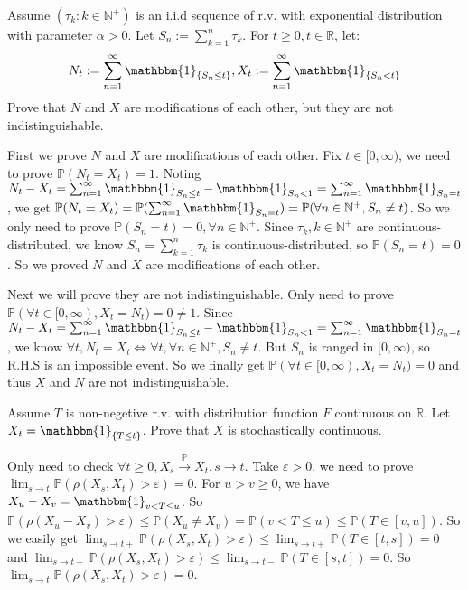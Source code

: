 \documentclass[../main]{subfiles}
\begin{document}
\begin{problem}\label{pro:4}
	Assume \((\tau_k:k \in \mathbb{N}^+)\) is an i.i.d sequence of r.v.
	with exponential distribution with parameter \(\alpha>0\).
	Let \(S_n:=\sum_{k=1}^{n}\tau_k\). For \(t \geq 0,t \in \mathbb{R}\), let:
	\[
		N_t:=\sum_{n=1}^{\infty}\mathbbm{1}_{\{S_n \leq t\}},
		X_t:=\sum_{n=1}^{\infty}\mathbbm{1}_{\{S_n < t\}}
	\]
	Prove that \(N\) and \(X\) are modifications of each other, but they are not indistinguishable.
\end{problem}
\begin{solution}
	First we prove \(N\) and \(X\) are modifications of each other.
	Fix \(t \in [0,\infty)\), we need to prove \(\mathbb{P}(N_t=X_t)=1\).
	Noting \(N_t-X_t = \sum_{n=1}^{\infty}\mathbbm{1}_{S_n \leq t}-\mathbbm{1}_{S_n<1}=\sum_{n=1}^{\infty}\mathbbm{1}_{S_n=t}\),
	we get \(\mathbb{P}(N_t=X_t)=\mathbb{P}(\sum_{n=1}^{\infty}\mathbbm{1}_{S_n=t})=\mathbb{P}(\forall n \in \mathbb{N}^+,S_n \neq t)\).
	So we only need to prove \(\mathbb{P}(S_n=t)=0,\forall n \in \mathbb{N}^+\).
	Since \(\tau_k,k \in \mathbb{N}^+\) are continuous-distributed, we know \(S_n=\sum_{k=1}^{n}\tau_k\) is continuous-distributed,
	so \(\mathbb{P}(S_n=t)=0\).
	So we proved \(N\) and \(X\) are modifications of each other.

	Next we will prove they are not indistinguishable.
	Only need to prove \(\mathbb{P}(\forall t \in [0,\infty),X_t=N_t)=0 \neq 1\).
	Since \(N_t-X_t = \sum_{n=1}^{\infty}\mathbbm{1}_{S_n \leq t}-\mathbbm{1}_{S_n<1}=\sum_{n=1}^{\infty}\mathbbm{1}_{S_n=t}\),
	we know \(\forall t,N_t=X_t \iff \forall t,\forall n \in \mathbb{N}^+,S_n \neq t\).
	But \(S_n\) is ranged in \([0,\infty)\), so R.H.S is an impossible event.
	So we finally get \(\mathbb{P}(\forall t \in [0,\infty),X_t=N_t)=0\) and thus \(X\) and \(N\) are not indistinguishable.
\end{solution}

\begin{problem}\label{pro:5}
	Assume \(T\) is non-negetive r.v. with distribution function \(F\) continuous on \(\mathbb{R}\).
	Let \(X_t=\mathbbm{1}_{\{T \leq t\}}\).
	Prove that \(X\) is stochastically continuous.
\end{problem}
\begin{solution}
	Only need to check \(\forall t \geq 0,X_s \overset{\mathbb{P}}{\to}X_t,s \to t\).
	Take \(\varepsilon >0\), we need to prove \(\lim_{s \to t}\mathbb{P}(\rho(X_s,X_t)>\varepsilon)=0\).
	For \(u>v \geq 0\), we have \(X_u-X_v=\mathbbm{1}_{v<T \leq u}\).
	So \(\mathbb{P}(\rho(X_u-X_v)>\varepsilon) \leq \mathbb{P}(X_u \neq X_v)=\mathbb{P}(v<T \leq u)\leq \mathbb{P}(T \in [v,u])\).
	So we easily get \(\lim_{s \to t+}\mathbb{P}(\rho(X_s,X_t)>\varepsilon)\leq \lim_{s \to t+}\mathbb{P}(T \in [t,s])=0\) and \(\lim_{s \to t-}\mathbb{P}(\rho(X_s,X_t)>\varepsilon)\leq \lim_{s \to t-}\mathbb{P}(T \in [s,t])=0\).
	So \(\lim_{s \to t}\mathbb{P}(\rho(X_s,X_t)>\varepsilon)=0\).
\end{solution}
\end{document}
